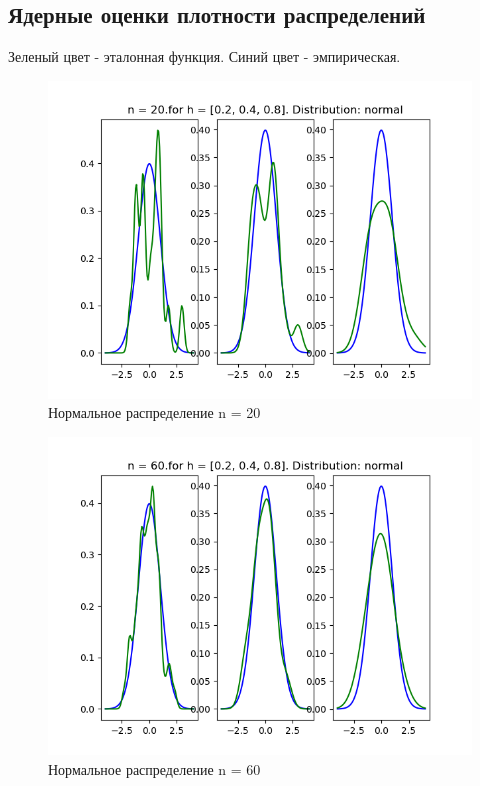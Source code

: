 \documentclass[a4]{article}
\begin{document}
		\subsection{Ядерные оценки плотности распределений}
		Зеленый цвет - эталонная функция. Синий цвет - эмпирическая.
		\begin{center}
		\begin{figure}[h!]
			\includegraphics[width=\textwidth]{normalker20.png} 
			\caption[Нормальное распределение n = 20]{Нормальное распределение n = 20}
		\end{figure}
		\newpage
		\begin{figure}[h!]
			\includegraphics[width=\textwidth]{normalker60.png} 
			\caption[Нормальное распределение n = 60]{Нормальное распределение n = 60}

\end{figure}
\end{center}
\end{document}
